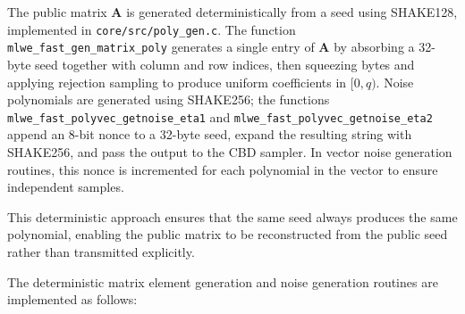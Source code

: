 The public matrix $\mathbf{A}$ is generated deterministically from a seed using SHAKE128, implemented in \texttt{core/}\allowbreak\texttt{src/}\allowbreak\texttt{poly\_gen.c}. The function \texttt{mlwe\_fast\_gen\_matrix\_poly} generates a single entry of $\mathbf{A}$ by absorbing a 32-byte seed together with column and row indices, then squeezing bytes and applying rejection sampling to produce uniform coefficients in $[0, q)$. Noise polynomials are generated using SHAKE256; the functions \texttt{mlwe\_}\allowbreak\texttt{fast\_}\allowbreak\texttt{polyvec\_}\allowbreak\texttt{get}\allowbreak\texttt{noise\_}\allowbreak\texttt{eta1} and \texttt{mlwe\_}\allowbreak\texttt{fast\_}\allowbreak\texttt{polyvec\_}\allowbreak\texttt{get}\allowbreak\texttt{noise\_}\allowbreak\texttt{eta2} append an 8-bit nonce to a 32-byte seed, expand the resulting string with SHAKE256, and pass the output to the CBD sampler. In vector noise generation routines, this nonce is incremented for each polynomial in the vector to ensure independent samples.

This deterministic approach ensures that the same seed always produces the same polynomial, enabling the public matrix to be reconstructed from the public seed rather than transmitted explicitly.

The deterministic matrix element generation and noise generation routines are implemented as follows:

